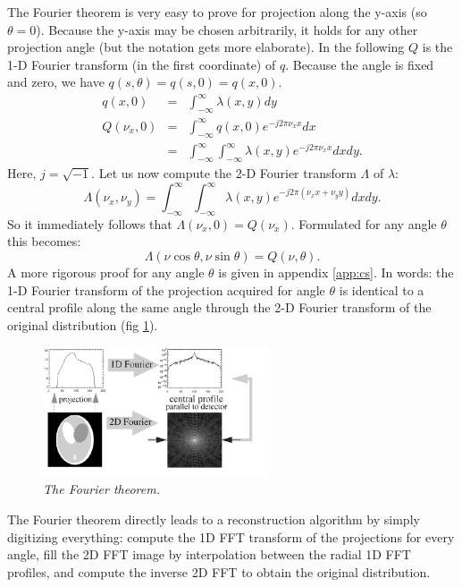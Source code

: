The Fourier theorem is very easy to prove for projection along the y-axis (so
$\theta = 0$). Because the y-axis may be chosen arbitrarily, it holds for
any other projection angle (but the notation gets more elaborate).
In the following $Q$ is the 1-D Fourier transform (in the first coordinate) of
$q$. Because the angle is fixed and zero, we have
$q(s, \theta) = q(s, 0) = q(x,0)$.
\begin{align}
  q(x,0) & = & \int_{-\infty}^{\infty} \lambda(x,y) dy \\
  Q(\nu_x,0) & = & \int_{-\infty}^{\infty}  q(x,0) e^{-j2\pi \nu_x x} dx \\
          & = & \int_{-\infty}^{\infty}  \int_{-\infty}^{\infty}
                 \lambda(x,y) e^{-j2\pi \nu_x x} dx dy.
\end{align}
Here, $j = \sqrt{-1}$. Let us now compute the 2-D Fourier transform
$\Lambda$ of $\lambda$:
\begin{equation}
\Lambda(\nu_x, \nu_y)  =   \int_{-\infty}^{\infty}  \int_{-\infty}^{\infty}
         \lambda(x,y) e^{-j2\pi (\nu_x x + \nu_y y)} dx dy.
\end{equation}
So it immediately follows that $\Lambda(\nu_x, 0) = Q(\nu_x)$.
Formulated for any angle $\theta$ this becomes:
\begin{equation}
  \Lambda(\nu \cos \theta, \nu \sin \theta) = Q(\nu, \theta). 
  \label{fouriertheorem}
\end{equation}
A more rigorous proof for any angle $\theta$ is given in appendix
\ref{app:cs}.  In words: the 1-D Fourier transform of the projection
acquired for angle $\theta$ is identical to a central profile along
the same angle through the 2-D Fourier transform of the original
distribution (fig \ref{fig:fouriertheorem}).

\begin{figure}[tb]
\centering
\includegraphics[width=0.6\textwidth]{figs/fig_fouriertheorem.pdf}
\caption{\emph{The Fourier theorem.}}
\label{fig:fouriertheorem} 
\end{figure}

The Fourier theorem directly leads to a reconstruction algorithm by simply
digitizing everything: compute the 1D FFT transform of the projections for
every angle, fill the 2D FFT image by interpolation between the radial 1D FFT
profiles, and compute the inverse 2D FFT to obtain the original distribution.

